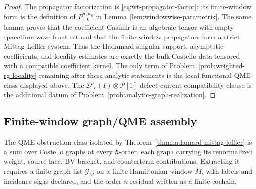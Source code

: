 \begin{proof}
  The propagator factorization is \eqref{eq:wt-propagator-factor}; its
  finite-window form is the definition of \(P_{\epsilon,L}^{w,w_0}\) in
  Lemma~\ref{lem:windowwise-parametrix}.  The same lemma proves that the
  coefficient Casimir is an algebraic tensor with empty spacetime
  wave-front set and that the finite-window propagators form a strict
  Mittag-Leffler system.  Thus the Hadamard singular support, asymptotic
  coefficients, and locality estimates are exactly the bulk Costello
  data tensored with a compatible coefficient kernel.  The only term of
  Problem~\ref{prob:weighted-rg-locality} remaining after these analytic
  statements is the local-functional QME class displayed above. The
  \(\mathcal D'_c(I)\otimes\mathcal P[1]\) defect-current compatibility
  clause is the additional datum of
  Problem~\ref{prob:analytic-graph-realization}.
\end{proof}

\subsection*{Finite-window graph/QME assembly}

The QME obstruction class isolated by
Theorem~\ref{thm:hadamard-mittag-leffler} is a sum over Costello graphs
at every \(\hbar\)-order, each graph carrying its renormalized weight,
source-face, BV-bracket, and counterterm contributions.  Extracting it
requires a finite graph list \(\mathcal G_M\) on a finite Hamiltonian
window \(M\), with labels and incidence signs declared, and the
order-\(n\) residual written as a finite cochain.

